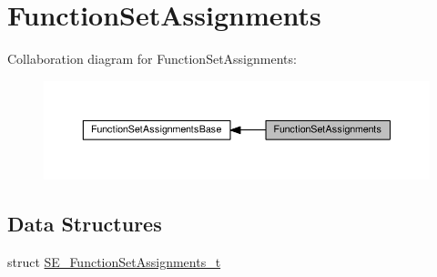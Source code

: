 \hypertarget{group__FunctionSetAssignments}{}\section{Function\+Set\+Assignments}
\label{group__FunctionSetAssignments}
Collaboration diagram for Function\+Set\+Assignments\+:\nopagebreak
\begin{figure}[H]
\begin{center}
\leavevmode
\includegraphics[width=350pt]{group__FunctionSetAssignments}
\end{center}
\end{figure}
\subsection*{Data Structures}
\begin{DoxyCompactItemize}
\item 
struct \hyperlink{structSE__FunctionSetAssignments__t}{S\+E\+\_\+\+Function\+Set\+Assignments\+\_\+t}
\end{DoxyCompactItemize}
